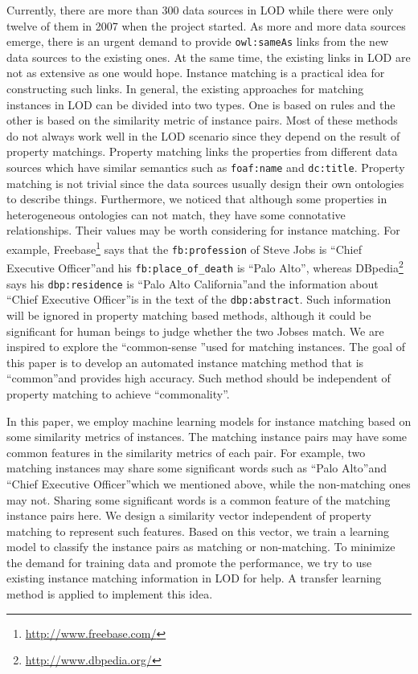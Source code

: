 Currently, there are more than 300 data sources in LOD while there were only twelve of them in 2007 when the project started. As more and more data sources emerge, there is an urgent demand to provide \texttt{owl:sameAs} links from the new data sources to the existing ones. At the same time, the existing links in LOD are not as extensive as one would hope\cite{hu2011self}. Instance matching is a practical idea for constructing such links. In general, the existing approaches for matching instances in LOD can be divided into two types. One is based on rules and the other is based on the similarity metric of instance pairs. Most of these methods do not always work well in the LOD scenario since they depend on the result of property matchings. Property matching links the properties from different data sources which have similar semantics such as \texttt{foaf:name} and \texttt{dc:title}. Property matching is not trivial since the data sources usually design their own ontologies to describe things. Furthermore, we noticed that although some properties in heterogeneous ontologies can not match, they have some connotative relationships. Their values may be worth considering for instance matching. For example, Freebase\footnote{\url{http://www.freebase.com/}} says that the \texttt{fb:profession} of Steve Jobs is \textquotedblleft Chief Executive Officer\textquotedblright  and his \texttt{fb:place\_of\_death} is \textquotedblleft Palo Alto\textquotedblright, whereas DBpedia\footnote{\url{http://www.dbpedia.org/}} says his \texttt{dbp:residence} is \textquotedblleft Palo Alto California\textquotedblright  and the information about \textquotedblleft Chief Executive Officer\textquotedblright  is in the text of the \texttt{dbp:abstract}. Such information will be ignored in property matching based methods, although it could be significant for human beings to judge whether the two Jobses match. We are inspired to explore the \textquotedblleft common-sense \textquotedblright  used for matching instances. The goal of this paper is to develop an automated instance matching method that is \textquotedblleft common\textquotedblright  and provides high accuracy. Such method should be independent of property matching to achieve \textquotedblleft commonality\textquotedblright .

In this paper, we employ machine learning models for instance matching based on some similarity metrics of instances. The matching instance pairs may have some common features in the similarity metrics of each pair. For example, two matching instances may share some significant words such as \textquotedblleft Palo Alto\textquotedblright  and \textquotedblleft Chief Executive Officer\textquotedblright  which we mentioned above, while the non-matching ones may not. Sharing some significant words is a common feature of the matching instance pairs here. We design a similarity vector independent of property matching to represent such features. Based on this vector, we train a learning model to classify the instance pairs as matching or non-matching. To minimize the demand for training data and promote the performance, we try to use existing instance matching information in LOD for help. A transfer learning method is applied to implement this idea.

